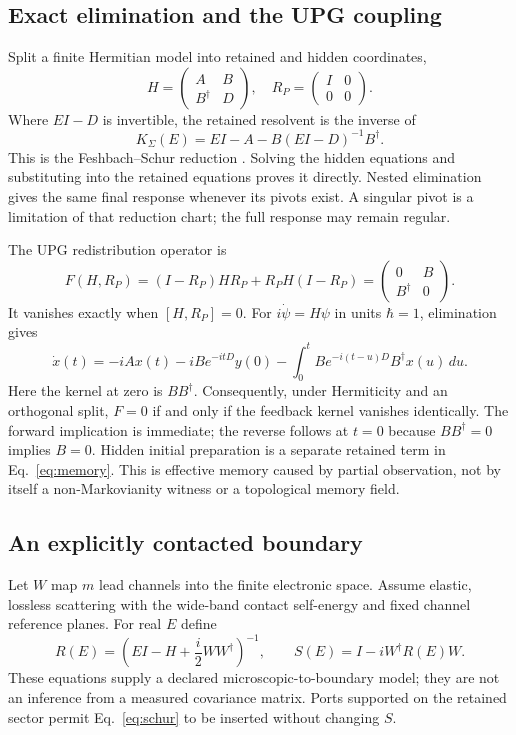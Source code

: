 \documentclass[11pt]{article}
\begin{document}
\subsection{Exact elimination and the UPG coupling}
Split a finite Hermitian model into retained and hidden coordinates,
\begin{equation}
H=\begin{pmatrix}A&B\\B^\dagger&D\end{pmatrix},\quad
R_P=\begin{pmatrix}I&0\\0&0\end{pmatrix}.
\end{equation}
Where $EI-D$ is invertible, the retained resolvent is the inverse of
\begin{equation}
K_\Sigma(E)=EI-A-B(EI-D)^{-1}B^\dagger.
\label{eq:schur}
\end{equation}
This is the Feshbach--Schur reduction \cite{feshbach}. Solving the hidden equations and substituting into the retained equations proves it directly. Nested elimination gives the same final response whenever its pivots exist. A singular pivot is a limitation of that reduction chart; the full response may remain regular.

The UPG redistribution operator is
\begin{equation}
F(H,R_P)=(I-R_P)HR_P+R_PH(I-R_P)
=\begin{pmatrix}0&B\\B^\dagger&0\end{pmatrix}.
\end{equation}
It vanishes exactly when $[H,R_P]=0$. For $i\dot\psi=H\psi$ in units $\hbar=1$, elimination gives
\begin{equation}
\dot x(t)=-iAx(t)-iBe^{-itD}y(0)
-\int_0^t Be^{-i(t-u)D}B^\dagger x(u)\,du.
\label{eq:memory}
\end{equation}
Here the kernel at zero is $BB^\dagger$. Consequently, under Hermiticity and an orthogonal split, $F=0$ if and only if the feedback kernel vanishes identically. The forward implication is immediate; the reverse follows at $t=0$ because $BB^\dagger=0$ implies $B=0$. Hidden initial preparation is a separate retained term in Eq.~\eqref{eq:memory}. This is effective memory caused by partial observation, not by itself a non-Markovianity witness or a topological memory field.

\subsection{An explicitly contacted boundary}
Let $W$ map $m$ lead channels into the finite electronic space. Assume elastic, lossless scattering with the wide-band contact self-energy and fixed channel reference planes. For real $E$ define
\begin{equation}
R(E)=\left(EI-H+\frac{i}{2}WW^\dagger\right)^{-1},\qquad
S(E)=I-iW^\dagger R(E)W.
\label{eq:scattering}
\end{equation}
These equations supply a declared microscopic-to-boundary model; they are not an inference from a measured covariance matrix. Ports supported on the retained sector permit Eq.~\eqref{eq:schur} to be inserted without changing $S$.
\end{document}
